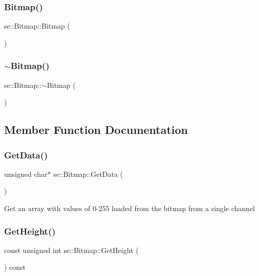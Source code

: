 \subsubsection{\texorpdfstring{Bitmap()}{Bitmap()}}
{\footnotesize\ttfamily se\+::\+Bitmap\+::\+Bitmap (\begin{DoxyParamCaption}{ }\end{DoxyParamCaption})}

\mbox{\label{classse_1_1_bitmap_aa098fcae7998e75240e46594fe84996e}} 
\subsubsection{\texorpdfstring{$\sim$\+Bitmap()}{~Bitmap()}}
{\footnotesize\ttfamily se\+::\+Bitmap\+::$\sim$\+Bitmap (\begin{DoxyParamCaption}{ }\end{DoxyParamCaption})}



\subsection{Member Function Documentation}
\mbox{\label{classse_1_1_bitmap_a2467e494eccacc94756c3f02b0d0cc5e}} 
\subsubsection{\texorpdfstring{Get\+Data()}{GetData()}}
{\footnotesize\ttfamily unsigned char$\ast$ se\+::\+Bitmap\+::\+Get\+Data (\begin{DoxyParamCaption}{ }\end{DoxyParamCaption})}

Get an array with values of 0-\/255 loaded from the bitmap from a single channel \mbox{\label{classse_1_1_bitmap_a24d34941103efc40b746d16bc4650970}} 
\subsubsection{\texorpdfstring{Get\+Height()}{GetHeight()}}
{\footnotesize\ttfamily const unsigned int se\+::\+Bitmap\+::\+Get\+Height (\begin{DoxyParamCaption}{ }\end{DoxyParamCaption}) const}

